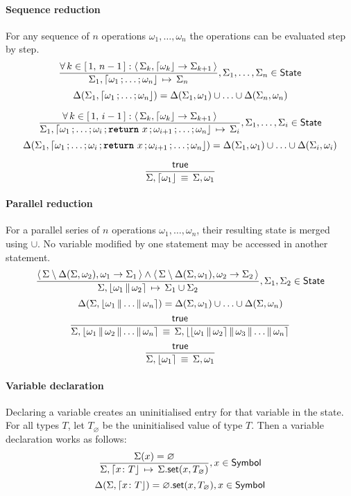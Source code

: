 \paragraph{Sequence reduction}
For any sequence of $n$ operations $\omega_1, \ldots, \omega_n$ the operations can be evaluated step by step.
$$
\semrule{
	\forall\, k \in \range{1}{n-1}: \results{\Sigma_k}{\stmt{\omega_k}}{\Sigma_{k+1}}}
	{\Sigma_1, \stmt{\omega_1}{\ldots}{\omega_n}}
	{\Sigma_n},
	\Sigma_1, \ldots, \Sigma_n \in \State
$$
$$
	\Delta(\Sigma_1, \stmt{\omega_1}{\ldots}{\omega_n}) =
		\Delta(\Sigma_1, \omega_1) \cup \ldots \cup \Delta(\Sigma_n, \omega_n)
$$

$$
\semrule{
	\forall\, k \in \range{1}{i-1}: \results{\Sigma_k}{\stmt{\omega_k}}{\Sigma_{k+1}}}
	{\Sigma_1, \stmt{\omega_1}{\ldots}{\omega_i}{\retstmt{x}}{\omega_{i+1}}{\ldots}{\omega_n}}
	{\Sigma_i},
	\Sigma_1, \ldots, \Sigma_i \in \State
$$
$$
	\Delta(\Sigma_1, \stmt{\omega_1}{\ldots}{\omega_i}{\retstmt{x}}{\omega_{i+1}}{\ldots}{\omega_n}) =
		\Delta(\Sigma_1, \omega_1) \cup \ldots \cup \Delta(\Sigma_i, \omega_i)
$$

$$
\semruleeq{\true}
	{\Sigma, \stmt{\omega_1}}
	{\Sigma, \omega_1}
$$

\paragraph{Parallel reduction}
For a parallel series of $n$ operations $\omega_1, \ldots, \omega_n$, their resulting state is merged using $\cup$.
No variable modified by one statement may be accessed in another statement.
$$
	\semrule{
		\results{\Sigma \setminus \Delta(\Sigma, \omega_2)}{\omega_1}{\Sigma_1} \land
		\results{\Sigma \setminus \Delta(\Sigma, \omega_1)}{\omega_2}{\Sigma_2}}
		{\Sigma, \parstmt{\omega_1}{\omega_2}}
		{\Sigma_1 \cup \Sigma_2},
			\Sigma_1, \Sigma_2 \in \State
$$
$$
	\Delta(\Sigma, \parstmt{\omega_1}{\ldots}{\omega_n}) = \Delta(\Sigma, \omega_1) \cup \ldots \cup \Delta(\Sigma, \omega_n)
$$
$$
	\semruleeq{\true}
		{\Sigma, \parstmt{\omega_1}{\omega_2}{\ldots}{\omega_n}}
		{\Sigma, \parstmt{\parstmt{\omega_1}{\omega_2}}{\omega_3}{\ldots}{\omega_n}}
$$
$$
\semruleeq{\true}
	{\Sigma, \parstmt{\omega_1}}
	{\Sigma, \omega_1}
$$

\paragraph{Variable declaration}
Declaring a variable creates an uninitialised entry for that variable in the state.
For all types $T$, let $T_\varnothing$ be the uninitialised value of type $T$.
Then a variable declaration works as follows:
$$
\semrule
	{\Sigma(x) = \varnothing}
	{\Sigma, \stmt{\varv{x}{T}}}
	{\StSet{\Sigma}{x}{T_\varnothing}},
		x \in \Symbol
$$
$$
\Delta(\Sigma, \stmt{\varv{x}{T}}) = \StSet{\varnothing}{x}{T_\varnothing},
                x \in \Symbol
$$

